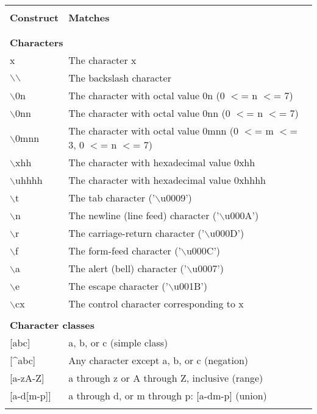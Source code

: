 \begin{longtable}{|p{3cm}|p{8cm}|}

\hline
 & \\
\textbf{Construct} & \textbf{Matches} \\
 & \\
\hline
\endhead

\hline
\endfoot

\multicolumn{2}{|l|}{\textbf{}}\\
\multicolumn{2}{|l|}{\textbf{Characters}}\\
\hline
x &	The character x \\
$\backslash$$\backslash$ & The backslash character \\
$\backslash$0n & The character with octal value 0n (0 $<$= n $<$= 7) \\
$\backslash$0nn & The character with octal value 0nn (0 $<$= n $<$= 7) \\
$\backslash$0mnn & The character with octal value 0mnn (0 $<$= m $<$= 3, 0 $<$= n $<$= 7) \\
$\backslash$xhh & The character with hexadecimal value 0xhh \\
$\backslash$uhhhh & The character with hexadecimal value 0xhhhh \\
$\backslash$t & The tab character ('$\backslash$u0009') \\
$\backslash$n & The newline (line feed) character ('$\backslash$u000A') \\
$\backslash$r &	The carriage-return character ('$\backslash$u000D') \\
$\backslash$f &	The form-feed character ('$\backslash$u000C') \\
$\backslash$a &	The alert (bell) character ('$\backslash$u0007') \\
$\backslash$e &	The escape character ('$\backslash$u001B') \\
$\backslash$cx & The control character corresponding to x \\
\hline
\multicolumn{2}{|l|}{\textbf{}}\\
\multicolumn{2}{|l|}{\textbf{Character classes}}\\
\hline
{[}abc{{]}}& a, b, or c (simple class) \\
{[}\textasciicircum abc{{]}} & Any character except a, b, or c (negation) \\
{[}a-zA-Z{]} & a through z or A through Z, inclusive (range) \\
{[}a-d{[}m-p{]}{]} & a through d, or m through p: {[}a-dm-p{]} (union) \\
$$
\end{longtable}
